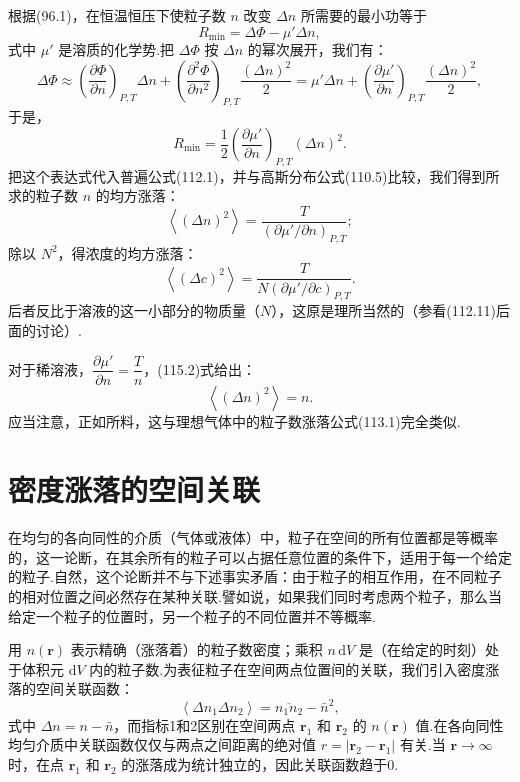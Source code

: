 根据(96.1)，在恒温恒压下使粒子数 $n$ 改变 $\Delta n$ 所需要的最小功等于
\begin{equation*}
  R_{\min}=\Delta\Phi-\mu'\Delta n,
\end{equation*}
式中 $\mu'$ 是溶质的化学势.把 $\Delta\Phi$ 按 $\Delta n$ 的幂次展开，我们有：
\begin{equation*}
  \Delta\Phi\approx\left(\frac{\partial\Phi}{\partial n}\right)_{P,T}\Delta n
  +\left(\frac{\partial^{2}\Phi}{\partial n^{2}}\right)_{P,T}
  \frac{(\Delta n)^{2}}{2}
  =\mu'\Delta n+\left(\frac{\partial\mu'}{\partial n}\right)_{P,T}
  \frac{(\Delta n)^{2}}{2},
\end{equation*}
于是，
\begin{equation*}
  R_{\min}=\frac{1}{2}\left(\frac{\partial\mu'}{\partial n}\right)_{P,T}
  (\Delta n)^{2}.
\end{equation*}
把这个表达式代入普遍公式(112.1)，并与高斯分布公式(110.5)比较，我们得到所求的粒子数 $n$ 的均方涨落：
\begin{equation}
  \left\langle(\Delta n)^{2}\right\rangle
  =\frac{T}{(\partial\mu'/\partial n)_{P,T}};
\end{equation}
除以 $N^{2}$，得浓度的均方涨落：
\begin{equation}
  \left\langle(\Delta c)^{2}\right\rangle
  =\frac{T}{N(\partial\mu'/\partial c)_{P,T}}.
\end{equation}
后者反比于溶液的这一小部分的物质量（$N$），这原是理所当然的（参看(112.11)后面的讨论）.

对于稀溶液，$\dfrac{\partial\mu'}{\partial n}=\dfrac{T}{n}$，(115.2)式给出：
\begin{equation}
  \left\langle(\Delta n)^{2}\right\rangle=n.
\end{equation}
应当注意，正如所料，这与理想气体中的粒子数涨落公式(113.1)完全类似.

\section{密度涨落的空间关联}

在均匀的各向同性的介质（气体或液体）中，粒子在空间的所有位置都是等概率的，这一论断，在其余所有的粒子可以占据任意位置的条件下，适用于每一个给定的粒子.自然，这个论断并不与下述事实矛盾：由于粒子的相互作用，在不同粒子的相对位置之间必然存在某种关联.譬如说，如果我们同时考虑两个粒子，那么当给定一个粒子的位置时，另一个粒子的不同位置并不等概率.

用 $n(\boldsymbol{r})$ 表示精确（涨落着）的粒子数密度；乘积 $n\,\mathrm{d}V$ 是（在给定的时刻）处于体积元 $\mathrm{d}V$ 内的粒子数.为表征粒子在空间两点位置间的关联，我们引入密度涨落的空间关联函数：
\begin{equation}
  \left\langle\Delta n_{1}\Delta n_{2}\right\rangle
  =\overline{n_{1}n_{2}}-\bar{n}^{2},
\end{equation}
式中 $\Delta n=n-\bar{n}$，而指标1和2区别在空间两点 $\boldsymbol{r}_{1}$ 和
$\boldsymbol{r}_{2}$ 的 $n(\boldsymbol{r})$ 值.在各向同性均匀介质中关联函数仅仅与两点之间距离的绝对值 $r=|\boldsymbol{r}_{2}-\boldsymbol{r}_{1}|$ 有关.当
$\boldsymbol{r}\to\infty$ 时，在点 $\boldsymbol{r}_{1}$ 和 $\boldsymbol{r}_{2}$ 的涨落成为统计独立的，因此关联函数趋于0.

